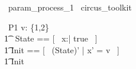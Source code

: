 
\begin{zsection}
  \SECTION\ param\_process\_1 \parents\ circus\_toolkit
\end{zsection}

\begin{circus}
    \circprocess\ P1 \circdef  v: \{1,2\} \circspot \circbegin  \\
    	\t1 \circstate\ State == [~ x:\nat | true ~] \\
    	\t1	Init == [~ (State)' | x' = v ~] \\
        \t1 \circspot \lschexpract Init \rschexpract \circseq \Skip \\
    \circend
\end{circus}
